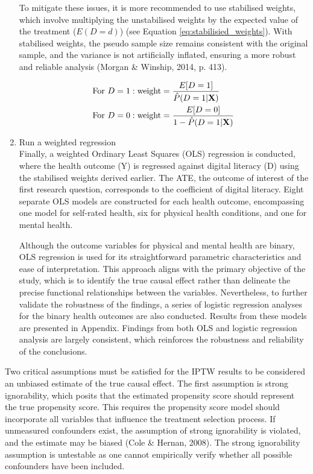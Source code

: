 \begin{enumerate}[wide=0pt, leftmargin=*, labelwidth=0pt, labelindent=\parindent, itemindent=0pt]
    To mitigate these issues, it is more recommended to use stabilised weights, which involve multiplying the unstabilised weights by the expected value of the treatment ($E(D = d)$) (see Equation \ref{eq:stabilisied_weights}). With stabilised weights, the pseudo sample size remains consistent with the original sample, and the variance is not artificially inflated, ensuring a more robust and reliable analysis (Morgan \& Winship, 2014, p. 413).

    \begin{equation}
        \label{eq:stabilisied_weights}
        \begin{aligned}
            \textnormal{For } D &= 1: \textnormal{weight} = \frac{E[D = 1]}{\hat{P}(D = 1 | \textbf{X})} \\
            \textnormal{For } D &= 0: \textnormal{weight} = \frac{E[D = 0]}{1 - \hat{P}(D = 1 | \textbf{X})}
        \end{aligned}
    \end{equation}

    \item Run a weighted regression \\
    Finally, a weighted Ordinary Least Squares (OLS) regression is conducted, where the health outcome (Y) is regressed against digital literacy (D) using the stabilised weights derived earlier. The ATE, the outcome of interest of the first research question, corresponds to the coefficient of digital literacy. Eight separate OLS models are constructed for each health outcome, encompassing one model for self-rated health, six for physical health conditions, and one for mental health. 

    Although the outcome variables for physical and mental health are binary, OLS regression is used for its straightforward parametric characteristics and ease of interpretation. This approach aligns with the primary objective of the study, which is to identify the true causal effect rather than delineate the precise functional relationships between the variables. Nevertheless, to further validate the robustness of the findings, a series of logistic regression analyses for the binary health outcomes are also conducted. Results from these models are presented in Appendix. Findings from both OLS and logistic regression analysis are largely consistent, which reinforces the robustness and reliability of the conclusions.
\end{enumerate}

Two critical assumptions must be satisfied for the IPTW results to be considered an unbiased estimate of the true causal effect. The first assumption is strong ignorability, which posits that the estimated propensity score should represent the true propensity score. This requires the propensity score model should incorporate all variables that influence the treatment selection process. If unmeasured confounders exist, the assumption of strong ignorability is violated, and the estimate may be biased (Cole \& Hernan, 2008). The strong ignorability assumption is untestable as one cannot empirically verify whether all possible confounders have been included. 

